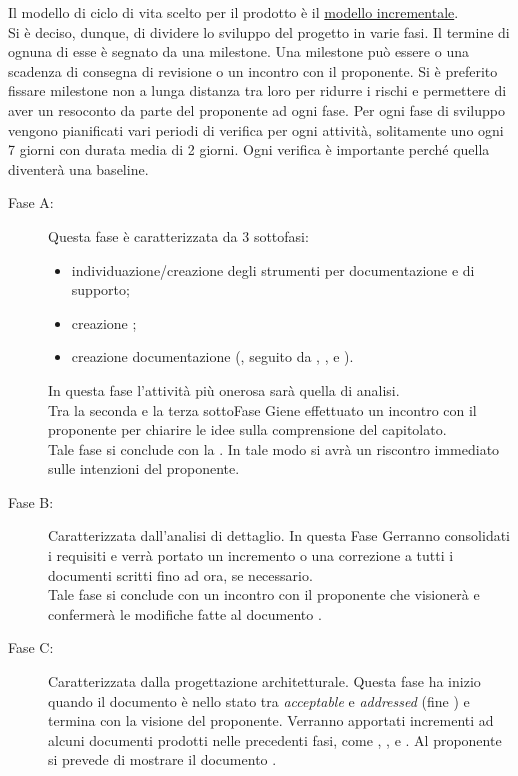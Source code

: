 		Il modello di ciclo di vita scelto per il prodotto è il \underline{modello incrementale}.\\Si è deciso, dunque, di dividere lo sviluppo del progetto in varie fasi. Il termine di ognuna di esse è segnato da una milestone. Una milestone può essere o una scadenza di consegna di revisione o un incontro con il proponente. Si è preferito fissare milestone non a lunga distanza tra loro per ridurre i rischi e permettere di aver un resoconto da parte del proponente ad ogni fase. Per ogni fase di sviluppo vengono pianificati vari periodi di verifica per ogni attività, solitamente uno ogni 7 giorni con durata media di 2 giorni. Ogni verifica è importante perché quella diventerà una baseline.
		\begin{description}
			\item[Fase A:] Questa fase è caratterizzata da 3 sottofasi:
				\begin{itemize}
					\item individuazione/creazione degli strumenti per documentazione e di supporto;
					\item creazione ;
					\item creazione documentazione (, seguito da , ,  e ).
				\end{itemize}
				In questa fase l'attività più onerosa sarà quella di analisi.\\Tra la seconda e la terza sottoFase Giene effettuato un incontro con il proponente per chiarire le idee sulla comprensione del capitolato.\\Tale fase si conclude con la . In tale modo si avrà un riscontro immediato sulle intenzioni del proponente.
			\item[Fase B:] Caratterizzata dall’analisi di dettaglio. In questa Fase Gerranno consolidati i requisiti  e verrà portato un incremento o una correzione a tutti i documenti scritti fino ad ora, se necessario.\\Tale fase si conclude con un incontro con il proponente che visionerà e confermerà le modifiche fatte al documento .
			\item[Fase C:] Caratterizzata dalla progettazione architetturale. Questa fase ha inizio quando il documento  è nello stato tra \textit{acceptable} e \textit{addressed} (fine ) e termina con la visione del proponente. Verranno apportati incrementi ad alcuni documenti prodotti nelle precedenti fasi, come , ,  e . Al proponente si prevede di mostrare il documento .

\end{description}
